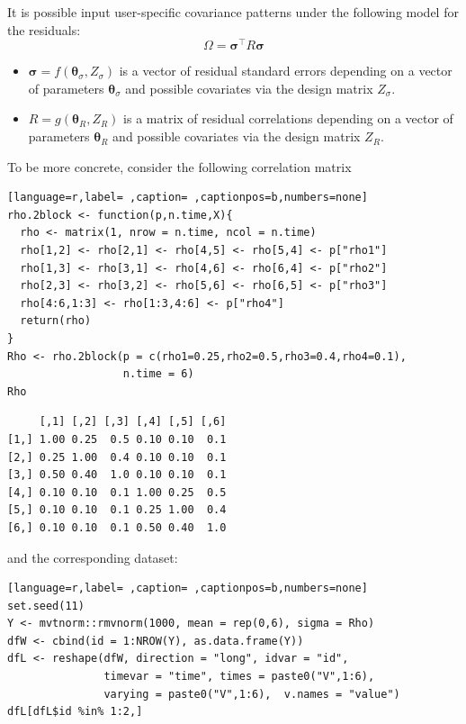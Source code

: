 \documentclass[12pt]{article}
\newcommand\trans[1]{{#1}^\intercal}%
\begin{document}
It is possible input user-specific covariance patterns under the
following model for the residuals: \[\Omega =
\trans{\boldsymbol{\sigma}} R \boldsymbol{\sigma}\]
\begin{itemize}
\item \(\boldsymbol{\sigma}=f(\boldsymbol{\theta}_{\sigma},Z_{\sigma})\)
is a vector of residual standard errors depending on a vector of
parameters \(\boldsymbol{\theta}_{\sigma}\) and possible covariates
via the design matrix \(Z_{\sigma}\).
\item \(R=g(\boldsymbol{\theta}_{R},Z_R)\) is a matrix of residual
correlations depending on a vector of parameters
\(\boldsymbol{\theta}_{R}\) and possible covariates via the design
matrix \(Z_R\).
\end{itemize}

\bigskip

To be more concrete, consider the following correlation matrix
\begin{lstlisting}[language=r,label= ,caption= ,captionpos=b,numbers=none]
rho.2block <- function(p,n.time,X){
  rho <- matrix(1, nrow = n.time, ncol = n.time)
  rho[1,2] <- rho[2,1] <- rho[4,5] <- rho[5,4] <- p["rho1"]
  rho[1,3] <- rho[3,1] <- rho[4,6] <- rho[6,4] <- p["rho2"]
  rho[2,3] <- rho[3,2] <- rho[5,6] <- rho[6,5] <- p["rho3"]
  rho[4:6,1:3] <- rho[1:3,4:6] <- p["rho4"]
  return(rho)
}
Rho <- rho.2block(p = c(rho1=0.25,rho2=0.5,rho3=0.4,rho4=0.1),
                  n.time = 6)
Rho
\end{lstlisting}

\begin{verbatim}
     [,1] [,2] [,3] [,4] [,5] [,6]
[1,] 1.00 0.25  0.5 0.10 0.10  0.1
[2,] 0.25 1.00  0.4 0.10 0.10  0.1
[3,] 0.50 0.40  1.0 0.10 0.10  0.1
[4,] 0.10 0.10  0.1 1.00 0.25  0.5
[5,] 0.10 0.10  0.1 0.25 1.00  0.4
[6,] 0.10 0.10  0.1 0.50 0.40  1.0
\end{verbatim}


and the corresponding dataset:
\begin{lstlisting}[language=r,label= ,caption= ,captionpos=b,numbers=none]
set.seed(11)
Y <- mvtnorm::rmvnorm(1000, mean = rep(0,6), sigma = Rho)
dfW <- cbind(id = 1:NROW(Y), as.data.frame(Y))
dfL <- reshape(dfW, direction = "long", idvar = "id",
               timevar = "time", times = paste0("V",1:6),
               varying = paste0("V",1:6),  v.names = "value")
dfL[dfL$id %in% 1:2,]
\end{lstlisting}
\end{document}
